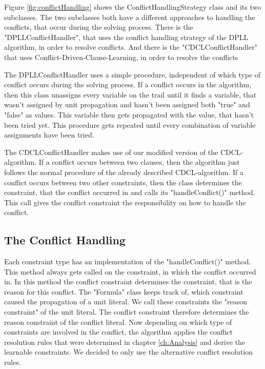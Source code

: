 Figure \ref{fig:conflictHandling} shows the ConflictHandlingStrategy class and its two subclasses. The two subclasses both have a different approaches to handling the conflicts, that occur during the solving process. There is the "DPLLConflictHandler", that uses the conflict handling strategy of the DPLL algorithm, in order to resolve conflicts. And there is the "CDCLConflictHandler" that uses Conflict-Driven-Clause-Learning, in order to resolve the conflicts
\par
The DPLLConflictHandler uses a simple procedure, independent of which type of conflict occurs during the solving process. If a conflict occurs in the algorithm, then this class unassigns every variable on the trail until it finds a variable, that wasn't assigned by unit propagation and hasn't been assigned both "true" and "false" as values. This variable then gets propagated with the value, that hasn't been tried yet. This procedure gets repeated until every combination of variable assignments have been tried.
\par
The CDCLConflictHandler makes use of our modified version of the CDCL-algorithm. If a conflict occurs between two clauses, then the algorithm just follows the normal procedure of the already described CDCL-algorithm. If a conflict occurs between two other constraints, then the class determines the constraint, that the conflict occurred in and calls its "handleConflict()" method. This call gives the conflict constraint the responsibility on how to handle the conflict.

\subsection{The Conflict Handling}

Each constraint type has an implementation of the "handleConflict()" method. This method always gets called on the constraint, in which the conflict occurred in. In this method the conflict constraint determines the constraint, that is the reason for this conflict. The "Formula" class keeps track of, which constraint caused the propagation of a unit literal. We call these constraints the "reason constraint" of the unit literal. The conflict constraint therefore determines the reason constraint of the conflict literal. Now depending on which type of constraints are involved in the conflict, the algorithm applies the conflict resolution rules that were determined in chapter \ref{ch:Analysis} and derive the learnable constraints. We decided to only use the alternative conflict resolution rules.


